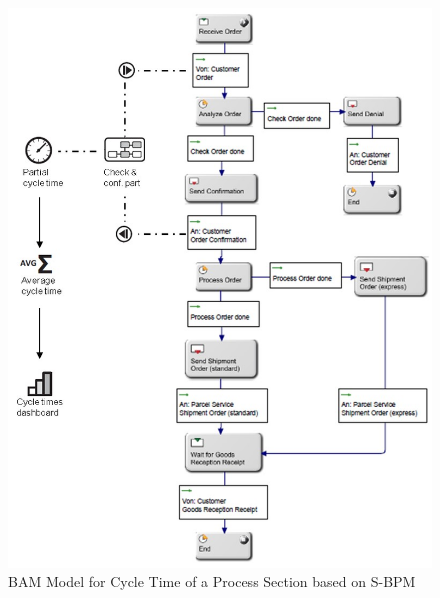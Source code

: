 \begin{figure}[h]
	\centering
	\includegraphics[width=0.9\linewidth]{Figures/Chapter5/Monitoring/BAM-Model-for-Cycle-Time-of-a-Process-Section-based-on-S-BPM.jpg}
	\caption[BAM Model for Cycle Time of a Process Section based on S-BPM]{BAM Model for Cycle Time of a Process Section based on S-BPM}
	\label{fig:BAM-Cycle-Time}
\end{figure}

